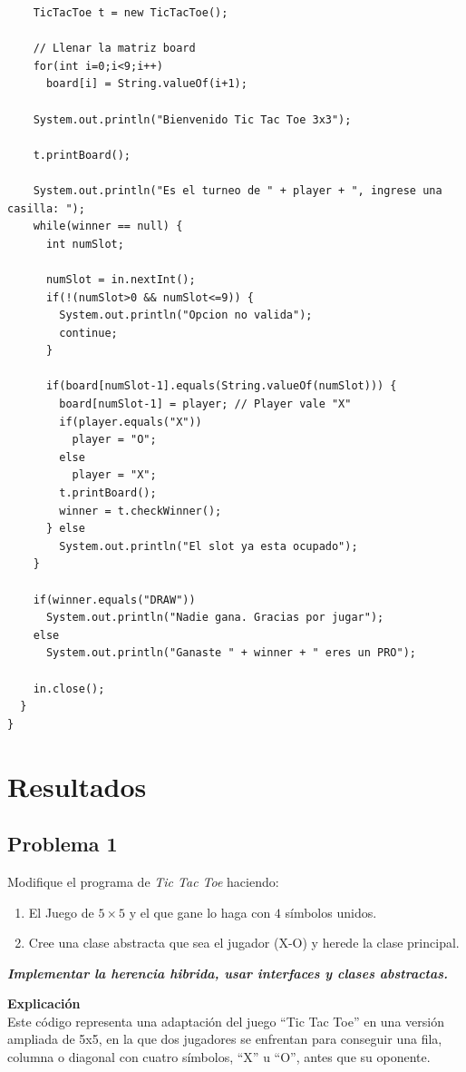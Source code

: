 \documentclass[11pt, twocolumn]{article}
\newcommand{\linejump}{\hfill \break}
\begin{document}
\begin{lstlisting}
    TicTacToe t = new TicTacToe();

    // Llenar la matriz board
    for(int i=0;i<9;i++)
      board[i] = String.valueOf(i+1);

    System.out.println("Bienvenido Tic Tac Toe 3x3");

    t.printBoard();

    System.out.println("Es el turneo de " + player + ", ingrese una casilla: ");
    while(winner == null) {
      int numSlot;

      numSlot = in.nextInt();
      if(!(numSlot>0 && numSlot<=9)) {
        System.out.println("Opcion no valida");
        continue;
      }

      if(board[numSlot-1].equals(String.valueOf(numSlot))) {
        board[numSlot-1] = player; // Player vale "X"
        if(player.equals("X"))
          player = "O";
        else
          player = "X";
        t.printBoard();
        winner = t.checkWinner();
      } else
        System.out.println("El slot ya esta ocupado");
    }

    if(winner.equals("DRAW"))
      System.out.println("Nadie gana. Gracias por jugar");
    else 
      System.out.println("Ganaste " + winner + " eres un PRO");

    in.close();
  }
}
  \end{lstlisting}

  \section*{Resultados}
  \subsection*{Problema 1}
  Modifique el programa de \textit{Tic Tac Toe} haciendo: 
  \begin{enumerate}[label=\alph*.]
    \item El Juego de $5\times 5$ y el que gane lo haga con $4$ símbolos unidos.
    \item Cree una clase abstracta que sea el jugador (X-O) y herede la clase principal.
  \end{enumerate}
  \textbf{\textit{Implementar la herencia hibrida, usar interfaces y clases abstractas.}}

  \linejump
  \textbf{Explicación} \\
  Este código representa una adaptación del juego ``Tic Tac Toe'' en una versión ampliada de 5x5, en la que dos jugadores se enfrentan para conseguir una fila, columna o diagonal con cuatro símbolos, ``X'' u ``O'', antes que su oponente.
\end{document}
